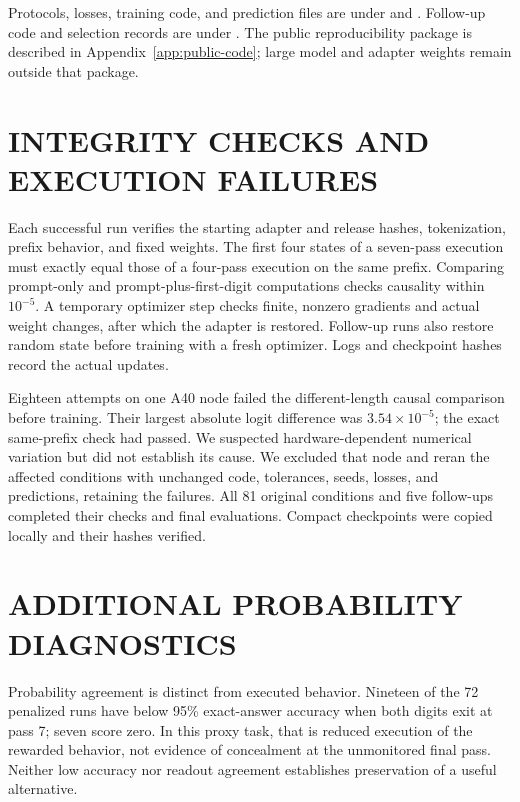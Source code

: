 \begin{sloppypar}
Protocols, losses, training code, and prediction files are under  and . Follow-up code and selection records are under . The public reproducibility package is described in Appendix~\ref{app:public-code}; large model and adapter weights remain outside that package.
\end{sloppypar}

\section{INTEGRITY CHECKS AND EXECUTION FAILURES}\label{app:integrity}
Each successful run verifies the starting adapter and release hashes, tokenization, prefix behavior, and fixed weights. The first four states of a seven-pass execution must exactly equal those of a four-pass execution on the same prefix. Comparing prompt-only and prompt-plus-first-digit computations checks causality within $10^{-5}$. A temporary optimizer step checks finite, nonzero gradients and actual weight changes, after which the adapter is restored. Follow-up runs also restore random state before training with a fresh optimizer. Logs and checkpoint hashes record the actual updates.

Eighteen attempts on one A40 node failed the different-length causal comparison before training. Their largest absolute logit difference was $3.54\times10^{-5}$; the exact same-prefix check had passed. We suspected hardware-dependent numerical variation but did not establish its cause. We excluded that node and reran the affected conditions with unchanged code, tolerances, seeds, losses, and predictions, retaining the failures. All 81 original conditions and five follow-ups completed their checks and final evaluations. Compact checkpoints were copied locally and their hashes verified.

\section{ADDITIONAL PROBABILITY DIAGNOSTICS}\label{app:diagnostics}
Probability agreement is distinct from executed behavior. Nineteen of the 72 penalized runs have below 95\% exact-answer accuracy when both digits exit at pass 7; seven score zero. In this proxy task, that is reduced execution of the rewarded behavior, not evidence of concealment at the unmonitored final pass. Neither low accuracy nor readout agreement establishes preservation of a useful alternative.

